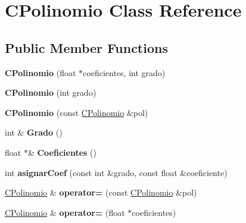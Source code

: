 \hypertarget{class_c_polinomio}{}\section{C\+Polinomio Class Reference}
\label{class_c_polinomio}
\subsection*{Public Member Functions}
\begin{DoxyCompactItemize}
\item 
\hypertarget{class_c_polinomio_a178d33aae3a58127a685e3c4d9ec95b5}{}\label{class_c_polinomio_a178d33aae3a58127a685e3c4d9ec95b5} 
{\bfseries C\+Polinomio} (float $\ast$coeficientes, int grado)
\item 
\hypertarget{class_c_polinomio_ad527d621b62708fa473863bd4239d9ef}{}\label{class_c_polinomio_ad527d621b62708fa473863bd4239d9ef} 
{\bfseries C\+Polinomio} (int grado)
\item 
\hypertarget{class_c_polinomio_a1cebfe2825df0ec87e6a9507b3c52925}{}\label{class_c_polinomio_a1cebfe2825df0ec87e6a9507b3c52925} 
{\bfseries C\+Polinomio} (const \hyperlink{class_c_polinomio}{C\+Polinomio} \&pol)
\item 
\hypertarget{class_c_polinomio_a652f12a0040749eeb3095aa675d4ce3f}{}\label{class_c_polinomio_a652f12a0040749eeb3095aa675d4ce3f} 
int \& {\bfseries Grado} ()
\item 
\hypertarget{class_c_polinomio_a09b93ec192deeabea042b1f7f3f0654f}{}\label{class_c_polinomio_a09b93ec192deeabea042b1f7f3f0654f} 
float $\ast$\& {\bfseries Coeficientes} ()
\item 
\hypertarget{class_c_polinomio_a154ebb9272894d1ac0a1e0e600a1cd9a}{}\label{class_c_polinomio_a154ebb9272894d1ac0a1e0e600a1cd9a} 
int {\bfseries asignar\+Coef} (const int \&grado, const float \&coeficiente)
\item 
\hypertarget{class_c_polinomio_ac5b0bf1a6414a0b22d5e111c50ca7a7d}{}\label{class_c_polinomio_ac5b0bf1a6414a0b22d5e111c50ca7a7d} 
\hyperlink{class_c_polinomio}{C\+Polinomio} \& {\bfseries operator=} (const \hyperlink{class_c_polinomio}{C\+Polinomio} \&pol)
\item 
\hypertarget{class_c_polinomio_ad3e87676ccefd2c35376629d76781d17}{}\label{class_c_polinomio_ad3e87676ccefd2c35376629d76781d17} 
\hyperlink{class_c_polinomio}{C\+Polinomio} \& {\bfseries operator=} (float $\ast$coeficientes)
\item 
\hypertarget{class_c_polinomio_af534cf1c94a7787e4539f2aa1ab33743}{}\label{class_c_polinomio_af534cf1c94a7787e4539f2aa1ab33743} 

\end{DoxyCompactItemize}

